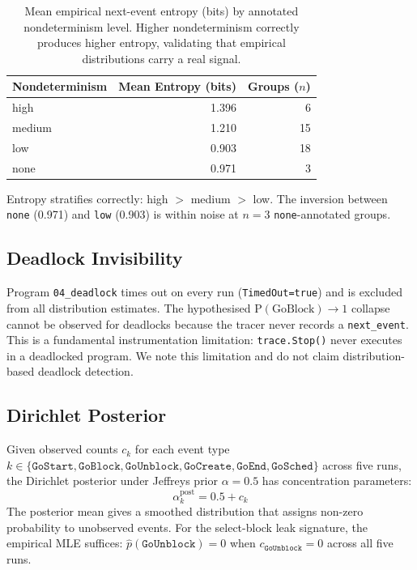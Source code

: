\documentclass[sigconf,review,anonymous]{acmart}
\begin{document}
\begin{table}[h]
\centering
\caption{Mean empirical next-event entropy (bits) by annotated nondeterminism
level. Higher nondeterminism correctly produces higher entropy, validating that
empirical distributions carry a real signal.}
\label{tab:entropy}
\begin{tabular}{lrr}
\toprule
\textbf{Nondeterminism} & \textbf{Mean Entropy (bits)} & \textbf{Groups ($n$)} \\
\midrule
high   & 1.396 & 6  \\
medium & 1.210 & 15 \\
low    & 0.903 & 18 \\
none   & 0.971 &  3 \\
\bottomrule
\end{tabular}
\end{table}

Entropy stratifies correctly: high $>$ medium $>$ low. The inversion between
\texttt{none} (0.971) and \texttt{low} (0.903) is within noise at $n{=}3$
\texttt{none}-annotated groups.

\subsection{Deadlock Invisibility}

Program \texttt{04\_deadlock} times out on every run (\texttt{TimedOut=true})
and is excluded from all distribution estimates. The hypothesised
$\mathrm{P(GoBlock)} \to 1$ collapse~\cite{meta2025cwm} cannot be observed for
deadlocks because the tracer never records a \texttt{next\_event}. This is a
fundamental instrumentation limitation: \texttt{trace.Stop()} never executes in a
deadlocked program. We note this limitation and do not claim distribution-based
deadlock detection.

\subsection{Dirichlet Posterior}

Given observed counts $c_k$ for each event type $k \in \{\texttt{GoStart},
\texttt{GoBlock}, \texttt{GoUnblock}, \texttt{GoCreate}, \texttt{GoEnd},
\texttt{GoSched}\}$ across five runs, the Dirichlet posterior under Jeffreys prior
$\alpha{=}0.5$ has concentration parameters:
\[
  \alpha_k^{\mathrm{post}} = 0.5 + c_k
\]
The posterior mean gives a smoothed distribution that assigns non-zero probability
to unobserved events. For the select-block leak signature, the empirical MLE
suffices: $\hat{p}(\texttt{GoUnblock}) = 0$ when $c_{\texttt{GoUnblock}} = 0$
across all five runs.
\end{document}
